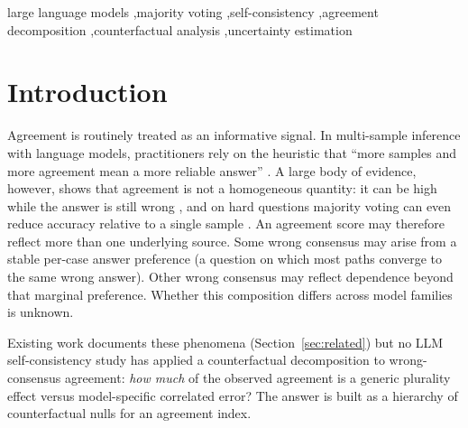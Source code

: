 \documentclass[a4paper,fleqn]{cas-sc}
\begin{document}
\begin{keywords}
large language models \sep majority voting \sep self-consistency \sep agreement decomposition \sep counterfactual analysis \sep uncertainty estimation
\end{keywords}

\maketitle

\section{Introduction}
\label{sec:intro}

Agreement is routinely treated as an informative signal. In multi-sample
inference with language models, practitioners rely on the heuristic that
``more samples and more agreement mean a more reliable answer''
\cite{wang2022selfconsistency}. A large
body of evidence, however, shows that agreement is not a homogeneous
quantity: it
can be high while the answer is still wrong \cite{ding2026auditing}, and on hard questions majority voting can even reduce
accuracy relative to a single sample \cite{bahuguna2026when}. An
agreement score may therefore reflect more than one underlying source.
Some wrong consensus may arise from a stable per-case answer preference
(a question on which most paths converge to the same wrong answer).
Other wrong consensus may reflect dependence beyond that marginal
preference. Whether this composition differs across model families is
unknown.

Existing work documents these phenomena (Section~\ref{sec:related}) but no LLM self-consistency study has applied a counterfactual decomposition to wrong-consensus agreement:
\emph{how much} of
the observed agreement is a generic
plurality effect versus model-specific correlated error? The answer is built as a hierarchy of counterfactual nulls for an agreement index.
\end{document}
